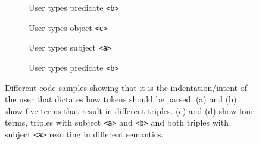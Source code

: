 \begin{figure}[tb]
    \centering
    \begin{subfigure}{0.21\textwidth}
      
      \caption{User types predicate \texttt{<b>}}
      \label{code1}
    \end{subfigure}
    \hfill
    \begin{subfigure}{0.21\textwidth}
      
      \caption{User types object \texttt{<c>}}
      \label{code2}
    \end{subfigure}
    \hfill
    \begin{subfigure}{0.21\textwidth}
      
      \caption{User types subject \texttt{<a>}}
      \label{code3}
    \end{subfigure}
    \hfill
    \begin{subfigure}{0.21\textwidth}
      
      \caption{User types predicate \texttt{<b>}}
      \label{code4}
    \end{subfigure}
    \caption{Different code samples showing that it is the indentation/intent of the user that dictates how tokens should be parsed. (a) and (b) show five terms that result in different triples. (c) and (d) show four terms, triples with subject \texttt{<a>} and \texttt{<b>} and both triples with subject \texttt{<a>} resulting in different semantics.    }\label{lst:GroupedListing}
\end{figure}
